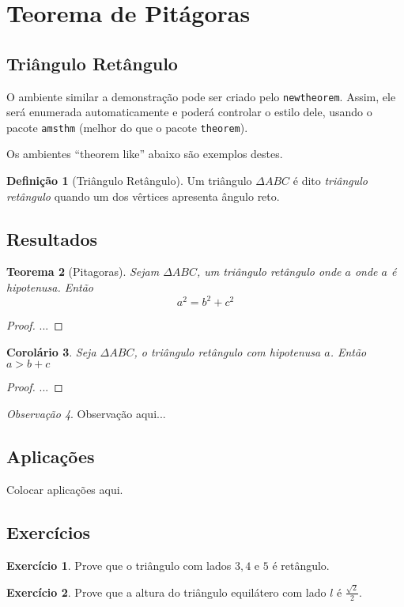 \documentclass[12pt,a4paper]{article}
\newtheorem{thm}{Teorema}[section] %
\newtheorem{cor}[thm]{Corolário} %
\theoremstyle{definition}
\newtheorem{defn}[thm]{Definição} %
\newtheorem{exerc}{Exercício}[section] %
\theoremstyle{remark}
\newtheorem{obs}[thm]{Observação} %
\begin{document}
\section{Teorema de Pitágoras}

\subsection{Triângulo Retângulo}
O ambiente similar a demonstração pode ser criado pelo \texttt{newtheorem}. Assim, ele será enumerada automaticamente e poderá controlar o estilo dele, usando o pacote \texttt{amsthm} (melhor do que o pacote \texttt{theorem}).

Os ambientes ``theorem like'' abaixo  são exemplos destes.

\begin{defn}[Triângulo Retângulo]
  Um triângulo $\Delta ABC$ é dito \emph{triângulo retângulo} quando um dos vêrtices 
  apresenta ângulo reto.
\end{defn}

\subsection{Resultados}
\begin{thm}[Pitagoras]
  Sejam $\Delta ABC$, um triângulo retângulo onde $a$ onde $a$ é hipotenusa. Então
  \[ a^2=b^2+c^2 \] 
\end{thm}

\begin{proof}
  ...
\end{proof}

\begin{cor}
 Seja $\Delta ABC$, o triângulo retângulo com hipotenusa $a$. Então $a > b+c$
\end{cor}

\begin{proof}
  ...
\end{proof}

\begin{obs}
Observação aqui...
\end{obs}

\subsection{Aplicações}

Colocar aplicações aqui.

\subsection{Exercícios}

\begin{exerc}
  Prove que o triângulo com lados $3,4$ e $5$ é retângulo.
\end{exerc}
\begin{exerc}
  Prove que a altura do triângulo equilátero com lado $l$ é $\frac{\sqrt{2}}{2}$.
\end{exerc}
\end{document}
